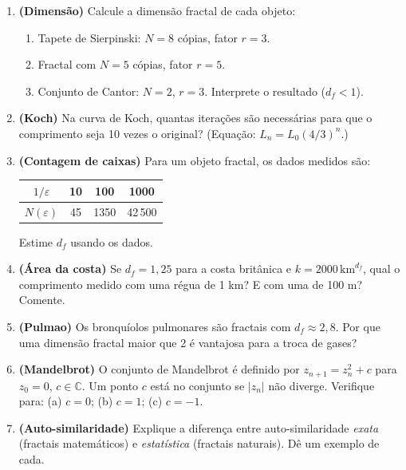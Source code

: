 \documentclass[12pt,a4paper]{article}
\begin{document}
\begin{enumerate}
  \item \textbf{(Dimens\~ao)} Calcule a dimens\~ao fractal de cada objeto:
    \begin{enumerate}
      \item[$a.$] Tapete de Sierpinski: $N=8$ c\'opias, fator $r=3$.
      \item[$b.$] Fractal com $N=5$ c\'opias, fator $r=5$.
      \item[$c.$] Conjunto de Cantor: $N=2$, $r=3$. Interprete o resultado ($d_f < 1$).
    \end{enumerate}
  
  \item \textbf{(Koch)} Na curva de Koch, quantas itera\c{c}\~oes s\~ao necess\'arias para que o comprimento seja 10 vezes o original? (Equa\c{c}\~ao: $L_n = L_0(4/3)^n$.)
  
  \item \textbf{(Contagem de caixas)} Para um objeto fractal, os dados medidos s\~ao:
    \begin{center}
    \begin{tabular}{|c|c|c|c|}
    \hline
    $1/\varepsilon$ & 10 & 100 & 1000 \\ \hline
    $N(\varepsilon)$ & 45 & 1350 & 42\,500 \\ \hline
    \end{tabular}
    \end{center}
    Estime $d_f$ usando os dados.
  
  \item \textbf{(\'Area da costa)} Se $d_f = 1{,}25$ para a costa brit\^anica e $k = 2000\,\text{km}^{d_f}$, qual o comprimento medido com uma r\'egua de 1 km? E com uma de 100 m? Comente.
  
  \item \textbf{(Pulmao)} Os bronqu\'iolos pulmonares s\~ao fractais com $d_f \approx 2{,}8$. Por que uma dimens\~ao fractal maior que 2 \'e vantajosa para a troca de gases?
  
  \item \textbf{(Mandelbrot)} O conjunto de Mandelbrot \'e definido por $z_{n+1} = z_n^2 + c$ para $z_0=0$, $c \in \mathbb{C}$. Um ponto $c$ est\'a no conjunto se $|z_n|$ n\~ao diverge. Verifique para: (a) $c=0$; (b) $c=1$; (c) $c=-1$.
  
  \item \textbf{(Auto-similaridade)} Explique a diferen\c{c}a entre auto-similaridade \emph{exata} (fractais matem\'aticos) e \emph{estat\'istica} (fractais naturais). D\^e um exemplo de cada.
\end{enumerate}
\end{document}
